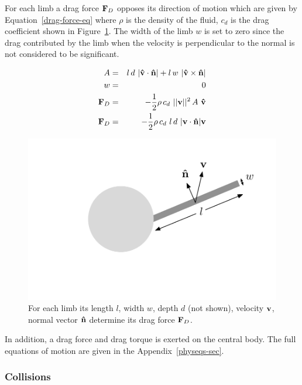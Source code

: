 For each limb a drag force $\mathbf{F}_D$ opposes its direction of motion
which are given by Equation~\ref{drag-force-eq} where $\rho$ is the
density of the fluid, $c_d$ is the drag coefficient shown in
Figure~\ref{drag-force}.  The width of the limb $w$ is set to zero
since the drag contributed by the limb when the velocity is
perpendicular to the normal is not considered to be significant.

\begin{eqnarray}
  A &=& l\,d~ |\mathbf{\hat{v}} \cdot \mathbf{\hat{n}}| + l\, w~|\mathbf{\hat{v}} \times \mathbf{\hat{n}}|\\
  w &=& 0 \\
  \mathbf{F}_D &=& -\frac{1}{2} \rho\,c_d~||\mathbf{v}||^2\,A~\mathbf{\hat{v}} \\
  \mathbf{F}_D &=& -\frac{1}{2} \rho\, c_d~ l\,d~|\mathbf{v} \cdot \mathbf{\hat{n}}|\mathbf{v} \label{drag-force-eq} 
\end{eqnarray}


\begin{figure}[h]  
  \centering
  \includegraphics[scale=0.7]{fig/drag-force.pdf} 
  \vspace{-45pt}
  \caption[Diagram of drag force]{\label{drag-force}For each limb its
    length $l$, width $w$, depth $d$ (not shown), velocity $\mathbf{v} $,
    normal vector $\mathbf{\hat{n}}$ determine its drag force $\mathbf{F}_D$.}
\end{figure}

In addition, a drag force and drag torque is exerted on the central
body.  The full equations of motion are given in the
Appendix~\ref{physeqs-sec}.

\subsubsection{Collisions}

